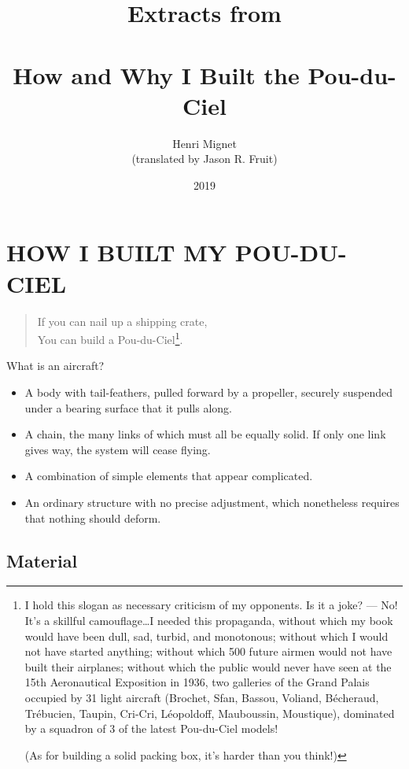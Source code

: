 \documentclass{book}
\title{{\small Extracts from}\\ \vspace{12pt}{\Huge Aerial
    Sport}\\{\Large How and Why I Built the Pou-du-Ciel}}
\author{Henri Mignet\\
  {\small (translated by Jason R. Fruit)}}
\date{2019}
\begin{document}
\maketitle
\tableofcontents

\selectfont

\chapter{HOW I BUILT MY POU-DU-CIEL}

\begin{verse}
  { \selectfont If you can nail up a shipping
    crate,\\ You can build a Pou-du-Ciel\footnote{I hold this slogan
      as necessary criticism of my opponents. Is it a joke? --- No!
      It's a skillful camouflage\ldots I needed this propaganda,
      without which my book would have been dull, sad, turbid, and
      monotonous; without which I would not have started anything;
      without which 500 future airmen would not have built their
      airplanes; without which the public would never have seen at the
      15th Aeronautical Exposition in 1936, two galleries of the Grand
      Palais occupied by 31 light aircraft (Brochet, Sfan, Bassou,
      Voliand, B\'echeraud, Tr\'ebucien, Taupin, Cri-Cri,
      L\'eopoldoff, Mauboussin, Moustique), dominated by a squadron of
      3 of the latest Pou-du-Ciel models!
      
      (As for building a solid packing box, it's harder than you
      think!)}.
    
}
\end{verse}


What is an aircraft?

\begin{itemize}
\item
  A body with tail-feathers, pulled forward by a propeller, securely
  suspended under a bearing surface that it pulls along.
\item
  A chain, the many links of which must all be equally solid. If only
  one link gives way, the system will cease flying.
\item
  A combination of simple elements that appear complicated.
\item
  An ordinary structure with no precise adjustment, which nonetheless
  requires that nothing should deform.
\end{itemize}

\section{Material}
\end{document}
